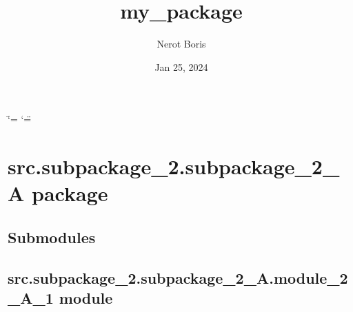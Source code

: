 \documentclass[letterpaper,10pt,english]{sphinxmanual}
\title{my\_package}
\date{Jan 25, 2024}
\author{Nerot Boris}
\begin{document}
\ifdefined\shorthandoff
  \ifnum\catcode`\=\string=\active\shorthandoff{=}\fi
  \ifnum\catcode`\"=\active{}\fi
\fi

\pagestyle{empty}
\sphinxmaketitle
\pagestyle{plain}
\sphinxtableofcontents
\pagestyle{normal}
\label{\detokenize{index::doc}}


\sphinxstepscope


\chapter{src.subpackage\_2.subpackage\_2\_A package}
\label{\detokenize{source/src.subpackage_2.subpackage_2_A:src-subpackage-2-subpackage-2-a-package}}\label{\detokenize{source/src.subpackage_2.subpackage_2_A::doc}}

\section{Submodules}
\label{\detokenize{source/src.subpackage_2.subpackage_2_A:submodules}}

\section{src.subpackage\_2.subpackage\_2\_A.module\_2\_A\_1 module}
\label{\detokenize{source/src.subpackage_2.subpackage_2_A:module-src.subpackage_2.subpackage_2_A.module_2_A_1}}\label{\detokenize{source/src.subpackage_2.subpackage_2_A:src-subpackage-2-subpackage-2-a-module-2-a-1-module}}
\end{document}
